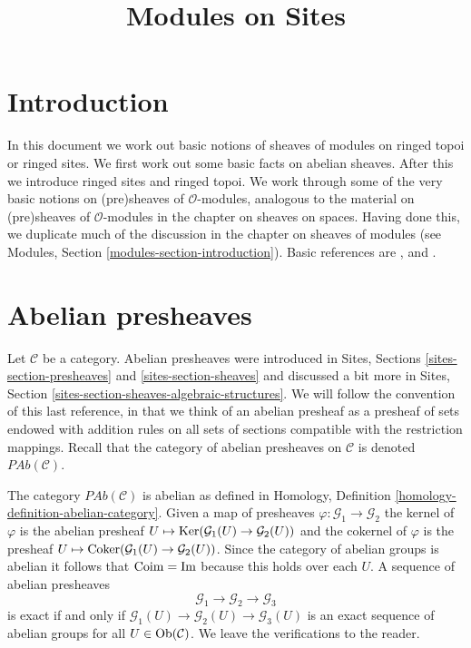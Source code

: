 

%


\title{Modules on Sites}


\maketitle

\label{section-phantom}

\tableofcontents

\section{Introduction}
\label{section-introduction}

\noindent
In this document we work out basic notions of sheaves of modules on
ringed topoi or ringed sites. We first work out some basic facts on
abelian sheaves. After this we introduce ringed sites and ringed topoi.
We work through some of the very basic notions on (pre)sheaves of
$\mathcal{O}$-modules, analogous to the material on (pre)sheaves of
$\mathcal{O}$-modules in the chapter on sheaves on spaces.
Having done this, we duplicate much of the discussion in the chapter on
sheaves of modules (see Modules, Section \ref{modules-section-introduction}).
Basic references are \cite{FAC}, \cite{EGA} and \cite{SGA4}.






\section{Abelian presheaves}
\label{section-abelian-pre-sheaves}

\noindent
Let $\mathcal{C}$ be a category.
Abelian presheaves were introduced in
Sites, Sections \ref{sites-section-presheaves}
and \ref{sites-section-sheaves} and discussed a bit more
in Sites, Section \ref{sites-section-sheaves-algebraic-structures}.
We will follow the convention of this last reference, in that we think
of an abelian presheaf as a presheaf of sets endowed with addition rules
on all sets of sections compatible with the restriction mappings.
Recall that the category of abelian presheaves on $\mathcal{C}$
is denoted $\textit{PAb}(\mathcal{C})$.

\medskip\noindent
The category $\textit{PAb}(\mathcal{C})$ is abelian as defined in
Homology, Definition \ref{homology-definition-abelian-category}.
Given a map of presheaves $\varphi : \mathcal{G}_1 \to \mathcal{G}_2$
the kernel of $\varphi$ is the abelian presheaf
$U \mapsto \mathop{\mathrm{Ker}}(\mathcal{G}_1(U) \to \mathcal{G}_2(U))$ and
the cokernel of $\varphi$ is the presheaf
$U \mapsto \mathop{\mathrm{Coker}}(\mathcal{G}_1(U) \to \mathcal{G}_2(U))$.
Since the category of abelian groups is abelian it follows that
$\mathop{\mathrm{Coim}} = \mathop{\mathrm{Im}}$ because this holds over each $U$.
A sequence of abelian presheaves
$$
\mathcal{G}_1 \longrightarrow
\mathcal{G}_2 \longrightarrow
\mathcal{G}_3
$$
is exact if and only if
$\mathcal{G}_1(U) \to \mathcal{G}_2(U) \to \mathcal{G}_3(U)$
is an exact sequence of abelian groups for all $U \in \mathop{\mathrm{Ob}}\nolimits(\mathcal{C})$.
We leave the verifications to the reader.

